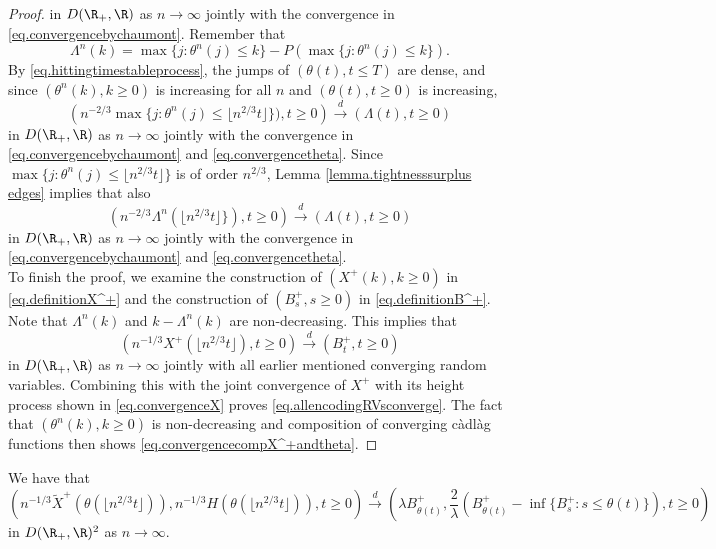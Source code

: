 \begin{proof}
   in $D(\R_+,\R)$ as $n\to \infty$ jointly with the convergence in \eqref{eq.convergencebychaumont}.
Remember that 
$$\Lambda^n(k)=\max\{j:\theta^{n}(j)\leq k\}-P(\max\{j:\theta^{n}(j)\leq k\}). $$ By \eqref{eq.hittingtimestableprocess}, the jumps of $\left(\theta(t),t\leq T\right)$ are dense, and since $(\theta^n(k),k\geq 0)$ is increasing for all $n$ and $(\theta(t),t\geq 0)$ is increasing,  
$$\left(n^{-2/3}\max\{j:\theta^{n}(j)\leq \lfloor n^{2/3} t \rfloor\} ),t\geq 0\right)\overset{d}{\to}\left( \Lambda(t),t\geq0 \right)$$
in $D(\R_+,\R)$ as $n\to \infty$ jointly with the convergence in \eqref{eq.convergencebychaumont} and \eqref{eq.convergencetheta}. Since $\max\{j:\theta^{n}(j)\leq \lfloor n^{2/3} t \rfloor\}$ is of order $n^{2/3}$, Lemma \ref{lemma.tightnesssurplus edges} implies that also 
$$\left(n^{-2/3}\Lambda^n\left(\lfloor n^{2/3} t \rfloor\} \right),t\geq 0\right)\overset{d}{\to}\left( \Lambda(t),t\geq0 \right)$$
in $D(\R_+,\R)$ as $n\to \infty$ jointly with the convergence in \eqref{eq.convergencebychaumont} and \eqref{eq.convergencetheta}.\\
To finish the proof, we examine the construction of $(X^+(k),k\geq 0)$ in \eqref{eq.definitionX^+} and the construction of $(B^+_s,s\geq 0)$ in \eqref{eq.definitionB^+}. 
Note that $\Lambda^n(k)$ and $k-\Lambda^n(k)$ are non-decreasing. This implies that 
$$\left(n^{-1/3}X^+\left( \lfloor n^{2/3} t \rfloor \right), t\geq 0 \right)\overset{d}{\to} \left( B^+_{t}, t\geq 0\right)$$
in $D(\R_+,\R)$ as $n\to \infty$ jointly with all earlier mentioned converging random variables. Combining this with the joint convergence of $X^+$ with its height process shown in \eqref{eq.convergenceX} proves \eqref{eq.allencodingRVsconverge}. The fact that $(\theta^n(k),k\geq 0)$ is non-decreasing and composition of converging c\`adl\`ag functions then shows \eqref{eq.convergencecompX^+andtheta}.
\end{proof}
\begin{lemma}\label{lemma.subtracterrorconverges}
We have that 
$$\left(n^{-1/3}\tilde{X}^+\left(\theta\left(\lfloor n^{2/3}t\rfloor \right)\right), n^{-1/3}H\left(\theta\left(\lfloor n^{2/3}t\rfloor \right) \right),t\geq 0 \right) \overset{d}{\to} \left(\lambda B^+_{\theta (t)},\frac{2}{\lambda} \left(B^+_{\theta (t)}-\inf\{B^+_{s}:s\leq \theta(t)\}\right) ,t\geq 0 \right)$$
in $D(\R_+,\R)^2$ as $n\to \infty$. 


\end{lemma}

